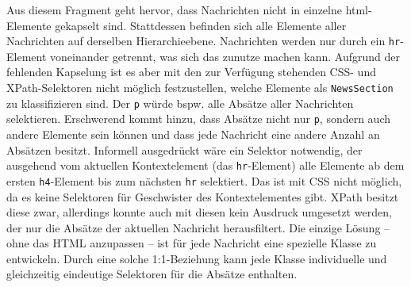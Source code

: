     Aus diesem Fragment geht hervor,
    dass Nachrichten nicht in einzelne \gls{html}-Elemente gekapselt sind.
    Stattdessen befinden sich alle Elemente aller Nachrichten auf derselben Hierarchieebene.
    Nachrichten werden nur durch ein \texttt{hr}-Element voneinander getrennt,
    was sich das {\classificationModel} zunutze machen kann.
    Aufgrund der fehlenden Kapselung ist es aber mit den zur Verfügung
    stehenden CSS- und XPath-Selektoren nicht möglich festzustellen,
    welche Elemente als \texttt{NewsSection} zu klassifizieren sind.
    Der {\cssSelector} \texttt{p} würde bspw. alle Absätze aller Nachrichten selektieren.
    Erschwerend kommt hinzu, dass Absätze nicht nur \texttt{p},
    sondern auch andere Elemente sein können und dass jede Nachricht eine andere Anzahl an Absätzen besitzt.
    Informell ausgedrückt wäre ein Selektor notwendig,
    der ausgehend vom aktuellen Kontextelement (das \texttt{hr}-Element) alle Elemente
    ab dem ersten \texttt{h4}-Element bis zum nächsten \texttt{hr} selektiert.
    Das ist mit CSS nicht möglich, da es keine Selektoren für Geschwister des Kontextelementes gibt.
    XPath besitzt diese zwar, allerdings konnte auch mit diesen kein
    Ausdruck umgesetzt werden, der nur die Absätze der aktuellen Nachricht herausfiltert.
    Die einzige Lösung -- ohne das HTML anzupassen -- ist für jede Nachricht eine spezielle Klasse zu entwickeln.
    Durch eine solche 1:1-Beziehung kann jede Klasse individuelle und gleichzeitig
    eindeutige Selektoren für die Absätze enthalten.
